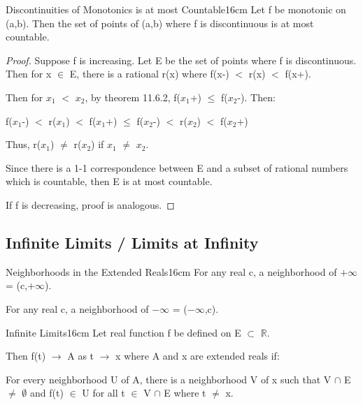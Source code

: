     \begin{wtheorem}{Discontinuities of Monotonics is at most Countable}{16cm}
        Let f be monotonic on (a,b).
        Then the set of points of (a,b) where f is discontinuous is
        at most countable.
    \end{wtheorem}

    \begin{proof}
        Suppose f is increasing.
        Let E be the set of points where f is discontinuous.
        Then for x $\in$ E, there is a rational r(x) where
        f(x-) $<$ r(x) $<$ f(x+).
        
        Then for $x_1$ $<$ $x_2$, by {\color{red} theorem 11.6.2},
        f($x_1$+) $\leq$ f($x_2$-). Then:

        \hspace{1cm}
        f($x_1$-) $<$ r($x_1$) $<$ f($x_1$+)
        $\leq$ f($x_2$-) $<$ r($x_2$) $<$ f($x_2$+)

        Thus, r($x_1$) $\not =$ r($x_2$) if $x_1$ $\not =$ $x_2$.

        Since there is a 1-1 correspondence between E and a subset
        of rational numbers which is countable, then E is at most countable.

        If f is decreasing, proof is analogous.
    \end{proof}

    \vspace{0.5cm}





\subsection{ Infinite Limits / Limits at Infinity }

    \begin{definition}{Neighborhoods in the Extended Reals}{16cm}
        For any real c, a neighborhood of $+\infty$ = (c,$+\infty$).

        For any real c, a neighborhood of $-\infty$ = ($-\infty$,c).        
    \end{definition}

    \vspace{0.5cm}



    \begin{definition}{Infinite Limits}{16cm}
        Let real function f be defined on E $\subset$ $\mathbb{R}$.

        Then f(t) $\rightarrow$ A as t $\rightarrow$ x where A and x
        are extended reals if:
        
        \begin{adjustbox}{minipage=15cm, right, vspace=0.1cm 0cm}
            For every neighborhood U of A,
            there is a neighborhood V of x such that V $\cap$ E $\not =$ $\emptyset$
            and f(t) $\in$ U for all t $\in$ V $\cap$ E where t $\not =$ x.
        \end{adjustbox}        
    \end{definition}

